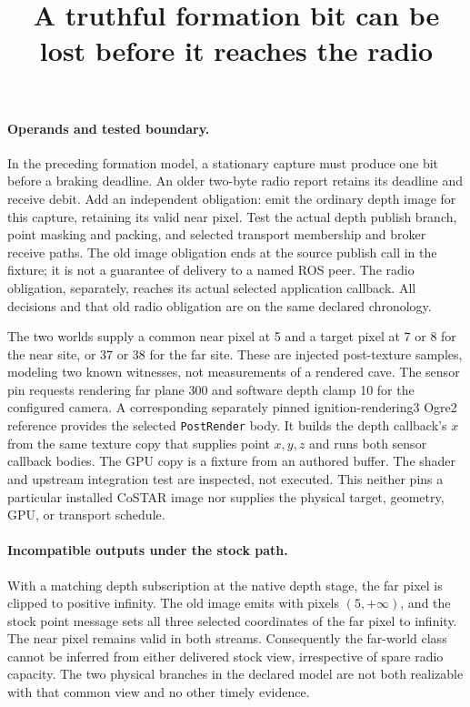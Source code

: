 \documentclass{article}
\begin{document}
\title{A truthful formation bit can be lost before it reaches the radio}
\maketitle

\paragraph{Operands and tested boundary.}
In the preceding formation model, a stationary capture must produce
one bit before a braking deadline. An older two-byte radio report
retains its deadline and receive debit. Add an independent obligation:
emit the ordinary depth image for this capture, retaining its valid
near pixel. Test the actual depth publish branch, point masking and
packing, and selected transport membership and broker receive paths.
The old image obligation ends at the source publish call in the
fixture; it is not a guarantee of delivery to a named ROS peer.
The radio obligation, separately, reaches its actual selected
application callback. All decisions and that old radio obligation
are on the same declared chronology.

The two worlds supply a common near pixel at 5 and a target pixel
at 7 or 8 for the near site, or 37 or 38 for the far site.
These are injected post-texture samples, modeling two known
witnesses, not measurements of a rendered cave. The sensor pin
requests rendering far plane 300 and software depth clamp 10 for
the configured camera. A corresponding separately pinned
ignition-rendering3 Ogre2 reference provides the selected
\texttt{PostRender} body. It builds the depth callback's $x$
from the same texture copy that supplies point $x,y,z$ and runs
both sensor callback bodies. The GPU copy is a fixture from an
authored buffer. The shader and upstream integration test are
inspected, not executed. This neither pins a particular installed
CoSTAR image nor supplies the physical target, geometry, GPU,
or transport schedule.

\paragraph{Incompatible outputs under the stock path.}
With a matching depth subscription at the native depth stage,
the far pixel is clipped to positive infinity. The old image
emits with pixels $(5,+\infty)$, and the stock point message
sets all three selected coordinates of the far pixel to infinity.
The near pixel remains valid in both streams. Consequently
the far-world class cannot be inferred from either delivered
stock view, irrespective of spare radio capacity. The two
physical branches in the declared model are not both realizable
with that common view and no other timely evidence.
\end{document}
